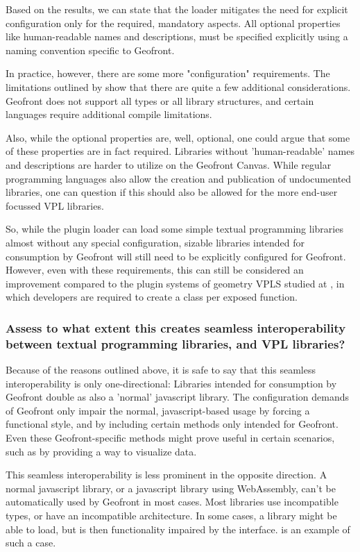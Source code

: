 Based on the results, we can state that the loader mitigates the need for explicit configuration only for the required, mandatory aspects. 
All optional properties like human-readable names and descriptions, must be specified explicitly using a naming convention specific to Geofront. 

In practice, however, there are some more "configuration" requirements. 
The limitations outlined by  show that there are quite a few additional considerations. 
Geofront does not support all types or all library structures, and certain languages require additional compile limitations.

Also, while the optional properties are, well, optional, one could argue that some of these properties are in fact required. 
Libraries without 'human-readable' names and descriptions are harder to utilize on the Geofront Canvas.
While regular programming languages also allow the creation and publication of undocumented libraries, one can question if this should also be allowed for the more end-user focussed VPL libraries.

So, while the plugin loader can load some simple textual programming libraries almost without any special configuration, sizable libraries intended for consumption by Geofront will still need to be explicitly configured for Geofront.
However, even with these requirements, this can still be considered an improvement compared to the plugin systems of geometry VPLS studied at , 
in which developers are required to create a class per exposed function.

\subsubsection*{Assess to what extent this creates seamless interoperability between textual programming libraries, and VPL libraries?}

Because of the reasons outlined above, it is safe to say that this seamless interoperability is only one-directional: Libraries intended for consumption by Geofront double as also a 'normal' javascript library. 
The configuration demands of Geofront only impair the normal, javascript-based usage by forcing a functional style, and by including certain methods only intended for Geofront. 
Even these Geofront-specific methods might prove useful in certain scenarios, such as by providing a way to visualize data.

This seamless interoperability is less prominent in the opposite direction. 
A normal javascript library, or a javascript library using WebAssembly, can't be automatically used by Geofront in most cases. 
Most libraries use incompatible types, or have an incompatible architecture.
In some cases, a library might be able to load, but is then functionality impaired by the interface. 
 is an example of such a case.

